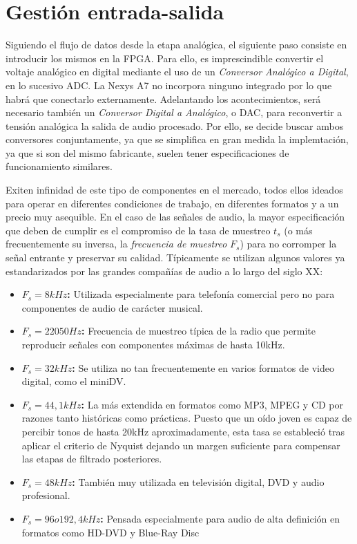 \section{Gestión entrada-salida}
Siguiendo el flujo de datos desde la etapa analógica, el siguiente paso consiste en introducir los mismos en la FPGA. Para ello, es imprescindible convertir el voltaje analógico en digital mediante el uso de un \emph{Conversor Analógico a Digital}, en lo sucesivo ADC. La Nexys A7 no incorpora ninguno integrado por lo que habrá que conectarlo externamente. Adelantando los acontecimientos, será necesario también un \emph{Conversor Digital a Analógico}, o DAC, para reconvertir a tensión analógica la salida de audio procesado. Por ello, se decide buscar ambos conversores conjuntamente, ya que se simplifica en gran medida la implemtación, ya que si son del mismo fabricante, suelen tener especificaciones de funcionamiento similares.

Exiten infinidad de este tipo de componentes en el mercado, todos ellos ideados para operar en diferentes condiciones de trabajo, en diferentes formatos y a un precio muy asequible. En el caso de las señales de audio, la mayor especificación que deben de cumplir es el compromiso de la tasa de muestreo $t_{s}$ (o más frecuentemente su inversa, la \emph{frecuencia de muestreo} $F_{s}$) para no corromper la señal entrante y preservar su calidad. Típicamente se utilizan algunos valores ya estandarizados por las grandes compañías de audio a lo largo del siglo XX:

\begin{itemize}
\item \textbf{$F_{s} = 8kHz$:} Utilizada especialmente para telefonía comercial pero no para componentes de audio de carácter musical.
\item \textbf{$F_{s} = 22050Hz$:} Frecuencia de muestreo típica de la radio que permite reproducir señales con componentes máximas de hasta 10kHz.
\item \textbf{$F_{s} = 32kHz$:} Se utiliza no tan frecuentemente en varios formatos de video digital, como el miniDV.
\item \textbf{$F_{s} = 44,1kHz$:} La más extendida en formatos como MP3, MPEG y CD por razones tanto históricas como prácticas. Puesto que un oído joven es capaz de percibir tonos de hasta 20kHz aproximadamente, esta tasa se estableció tras aplicar el criterio de Nyquist dejando un margen suficiente para compensar las etapas de filtrado posteriores.
\item \textbf{$F_{s} = 48kHz$:} También muy utilizada en televisión digital, DVD y audio profesional.
\item \textbf{$F_{s} = 96 o 192,4kHz$:} Pensada especialmente para audio de alta definición en formatos como HD-DVD y Blue-Ray Disc
\end{itemize}

